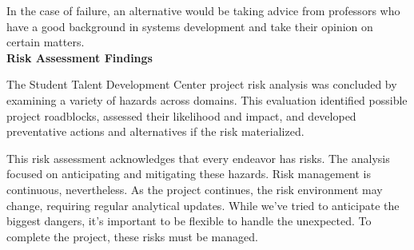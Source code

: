 \begin{justify}
\begin{enumerate}
    \newendline In the case of failure, an alternative would be taking advice from professors who have a good background in systems development and take their opinion on certain matters.\\

    \newendline \textbf{Risk Assessment Findings}

    \newendline The Student Talent Development Center project risk analysis was concluded by examining a variety of hazards across domains. This evaluation identified possible project roadblocks, assessed their likelihood and impact, and developed preventative actions and alternatives if the risk materialized.

    \newendline This risk assessment acknowledges that every endeavor has risks. The analysis focused on anticipating and mitigating these hazards. Risk management is continuous, nevertheless. As the project continues, the risk environment may change, requiring regular analytical updates. While we've tried to anticipate the biggest dangers, it's important to be flexible to handle the unexpected. To complete the project, these risks must be managed.
\end{enumerate}
\end{justify}

\clearpage


